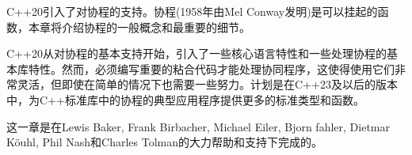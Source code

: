 C++20引入了对协程的支持。协程(1958年由Mel Conway发明)是可以挂起的函数，本章将介绍协程的一般概念和最重要的细节。

C++20从对协程的基本支持开始，引入了一些核心语言特性和一些处理协程的基本库特性。然而，必须编写重要的粘合代码才能处理协同程序，这使得使用它们非常灵活，但即使在简单的情况下也需要一些努力。计划是在C++23及以后的版本中，为C++标准库中的协程的典型应用程序提供更多的标准类型和函数。

这一章是在Lewis Baker, Frank Birbacher, Michael Eiler, Bjorn fahler, Dietmar K{\"o}uhl, Phil Nash和Charles Tolman的大力帮助和支持下完成的。